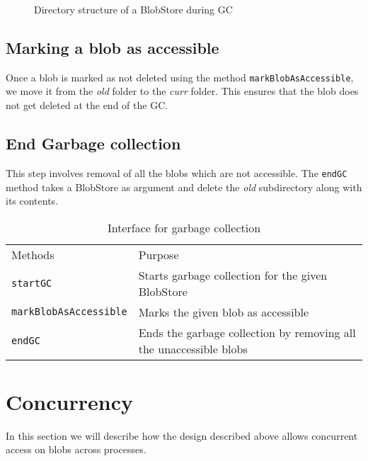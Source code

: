 \begin{figure}[hbt]
  \caption{Directory structure of a BlobStore during GC}
  \label{fig:blobstore-dirstructure-gc}
\end{figure}

\subsection{Marking a blob as accessible}
Once a blob is marked as not deleted using the method \texttt{markBlobAsAccessible}, we move it from the \textit{old} folder to the \textit{curr} folder. This ensures that the blob does not get deleted at the end of the GC.

\subsection{End Garbage collection}
This step involves removal of all the blobs which are not accessible. The \texttt{endGC} method takes a BlobStore as argument and delete the \textit{old} subdirectory along with its contents.

\begin{table}[hbt]
\caption{Interface for garbage collection}
\label{tab:interface-gc}
\begin{center}
  \begin{tabularx}{0.91\textwidth}{lX}
    \hline\noalign{\smallskip}
    Methods & Purpose \\
    \noalign{\smallskip}
    \hline
    \noalign{\smallskip}
    \texttt{startGC} & Starts garbage collection for the given BlobStore\\
    \texttt{markBlobAsAccessible} & Marks the given blob as accessible\\
    \texttt{endGC} & Ends the garbage collection by removing all the unaccessible blobs\\
    \hline
  \end{tabularx}
\end{center}
\end{table}

\section{Concurrency}
In this section we will describe how the design described above allows concurrent access on blobs across processes.
